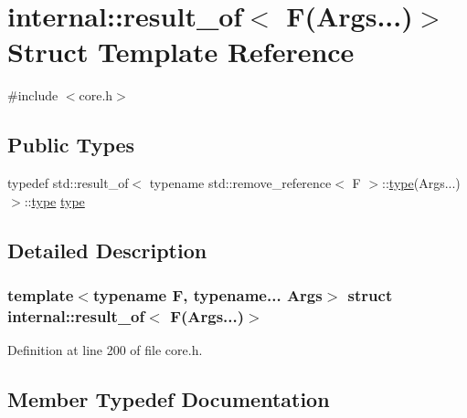 \hypertarget{structinternal_1_1result__of_3_01_f_07_args_8_8_8_08_4}{}\section{internal\+:\+:result\+\_\+of$<$ F(Args...)$>$ Struct Template Reference}
\label{structinternal_1_1result__of_3_01_f_07_args_8_8_8_08_4}


{\ttfamily \#include $<$core.\+h$>$}

\subsection*{Public Types}
\begin{DoxyCompactItemize}
\item 
typedef std\+::result\+\_\+of$<$ typename std\+::remove\+\_\+reference$<$ F $>$\+::\hyperlink{structinternal_1_1result__of_3_01_f_07_args_8_8_8_08_4_a7357d60ac9880b6a8fd70bbed3cc18f5}{type}(Args...)$>$\+::\hyperlink{structinternal_1_1result__of_3_01_f_07_args_8_8_8_08_4_a7357d60ac9880b6a8fd70bbed3cc18f5}{type} \hyperlink{structinternal_1_1result__of_3_01_f_07_args_8_8_8_08_4_a7357d60ac9880b6a8fd70bbed3cc18f5}{type}
\end{DoxyCompactItemize}


\subsection{Detailed Description}
\subsubsection*{template$<$typename F, typename... Args$>$\newline
struct internal\+::result\+\_\+of$<$ F(\+Args...)$>$}



Definition at line 200 of file core.\+h.



\subsection{Member Typedef Documentation}
\mbox{\label{structinternal_1_1result__of_3_01_f_07_args_8_8_8_08_4_a7357d60ac9880b6a8fd70bbed3cc18f5}} 
